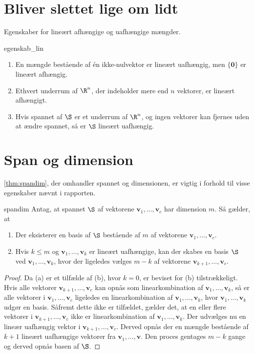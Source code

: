 \chapter{Bliver slettet lige om lidt}
%
Egenskaber for lineært afhængige og uafhængige mængder.
%
\begin{thm}{}{egenskab_lin}
\begin{enumerate}
\item En mængde bestående af én ikke-nulvektor er lineært uafhængig, men $\{\textbf{0}\}$ er lineært afhængig.
\item Ethvert underrum af $\R^n$, der indeholder mere end $n$ vektorer, er lineært afhængigt.
\item Hvis spannet af $\S$ er et underrum af $\R^n$, og ingen vektorer kan fjernes uden at ændre spannet, så er $\S$ lineært uafhængig.
\end{enumerate}
\end{thm}
%
\chapter{Span og dimension}
%
\ref{thm:spandim}, der omhandler spannet og dimensionen, er vigtig i forhold til visse egenskaber nævnt i rapporten.
%
\begin{thm}{}{spandim}
Antag, at spannet $\S$ af vektorene $\textbf{v}_1,\ldots,\textbf{v}_c$ har dimension $m$.
Så gælder, at
\begin{enumerate}[label=(\alph*)]
\item Der eksisterer en basis af $\S$ bestående af $m$ af vektorene $\mathbf{v}_1,\ldots,\mathbf{v}_c$.
\item Hvis $k\leq m$ og $\mathbf{v}_1,\ldots,\mathbf{v}_k$ er lineært uafhængige, kan der skabes en basis $\S$ ved $\mathbf{v}_1,\ldots,\mathbf{v}_k$, hvor der ligeledes vælges $m-k$ af vektorene $\mathbf{v}_{k+1},\ldots,\textbf{v}_c$.
\end{enumerate}
\end{thm}

\begin{proof}
Da (a) er et tilfælde af (b), hvor $k=0$, er beviset for (b) tilstrækkeligt.
Hvis alle vektorer $\mathbf{v}_{k+1},\ldots,\textbf{v}_c$ kan opnås som linearkombination af $\mathbf{v}_1,\ldots,\mathbf{v}_k$, så er alle vektorer i $\mathbf{v}_{1},\ldots,\textbf{v}_c$ ligeledes en linearkombination af $\mathbf{v}_1,\ldots,\mathbf{v}_k$, hvor $\mathbf{v}_1,\ldots,\mathbf{v}_k$ udgør en basis.
Såfremt dette ikke er tilfældet, gælder det, at en eller flere vektorer i $\mathbf{v}_{k+1},\ldots,\textbf{v}_c$ ikke er linearkombination af $\mathbf{v}_1,\ldots,\mathbf{v}_k$. 
Der udvælges nu en lineær uafhængig vektor i $\mathbf{v}_{k+1},\ldots,\textbf{v}_c$.
Derved opnås der en mængde bestående af $k+1$ lineært uafhængige vektorer fra $\mathbf{v}_{1},\ldots,\mathbf{v}$.
Den proces gentages $m-k$ gange og derved opnås basen af $\S$.
\end{proof}
%